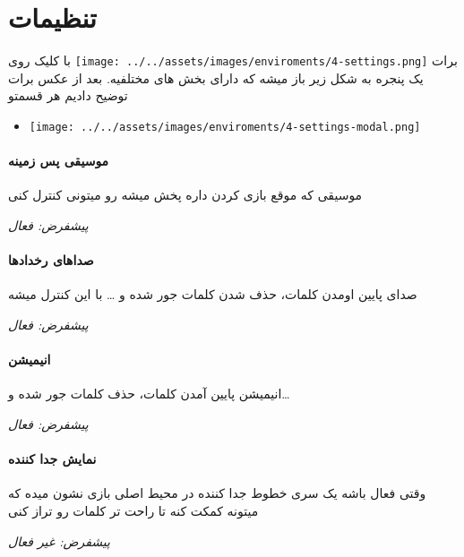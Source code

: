 \documentclass[]{article}
\providecommand{\tightlist}{%
  \setlength{\itemsep}{0pt}\setlength{\parskip}{0pt}}
\let\oldparagraph\paragraph
\renewcommand{\paragraph}[1]{\oldparagraph{#1}\mbox{}}
\begin{document}
\section{تنظیمات}\label{ux62aux646ux638ux6ccux645ux627ux62a}

با کلیک روی
\texttt{[image: ../../assets/images/enviroments/4-settings.png]} برات یک
پنجره به شکل زیر باز میشه که دارای بخش های مختلفیه. بعد از عکس برات
توضیح دادیم هر قسمتو

\begin{itemize}
\tightlist
\item
  \texttt{[image: ../../assets/images/enviroments/4-settings-modal.png]}
\end{itemize}

\paragraph{موسیقی پس
زمینه}\label{ux645ux648ux633ux6ccux642ux6cc-ux67eux633-ux632ux645ux6ccux646ux647}

موسیقی که موقع بازی کردن داره پخش میشه رو میتونی کنترل کنی

\emph{پیشفرض: فعال}

\paragraph{صداهای
رخدادها}\label{ux635ux62fux627ux647ux627ux6cc-ux631ux62eux62fux627ux62fux647ux627}

صدای پایین اومدن کلمات، حذف شدن کلمات جور شده و \ldots{} با این کنترل
میشه

\emph{پیشفرض: فعال}

\paragraph{انیمیشن}\label{ux627ux646ux6ccux645ux6ccux634ux646}

انیمیشن پایین آمدن کلمات، حذف کلمات جور شده و\ldots{}

\emph{پیشفرض: فعال}

\paragraph{نمایش جدا
کننده}\label{ux646ux645ux627ux6ccux634-ux62cux62fux627-ux6a9ux646ux646ux62fux647}

وقتی فعال باشه یک سری خطوط جدا کننده در محیط اصلی بازی نشون میده که
میتونه کمکت کنه تا راحت تر کلمات رو تراز کنی

\emph{پیشفرض: غیر فعال}
\end{document}
